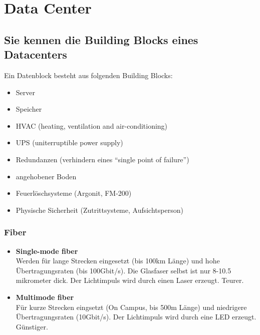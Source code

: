 \chapter{Data Center}

\section{Sie kennen die Building Blocks eines Datacenters}

Ein Datenblock besteht aus folgenden Building Blocks:

\begin{itemize}
	\item Server
	\item Speicher
	\item HVAC (heating, ventilation and air-conditioning)
	\item UPS (uniterruptible power supply)
	\item Redundanzen (verhindern eines “single point of failure”)
	\item angehobener Boden
	\item Feuerlöschsysteme (Argonit, FM-200)
	\item Physische Sicherheit (Zutrittsysteme, Aufsichtsperson)
\end{itemize}

\subsection{Fiber}
\begin{itemize}
	\item \textbf{Single-mode fiber}\\
		Werden für lange Strecken eingesetzt (bis 100km Länge) und hohe Übertragungsraten (bis 100Gbit/s). Die Glasfaser selbst ist nur 8-10.5 mikrometer dick. Der Lichtimpuls wird durch einen Laser erzeugt. Teurer.
	\item \textbf{Multimode fiber}\\
	Für kurze Strecken eingsetzt (On Campus, bis 500m Länge) und niedrigere Übertragungsraten (10Gbit/s). Der Lichtimpuls wird durch eine LED erzeugt. Günstiger.
\end{itemize}

